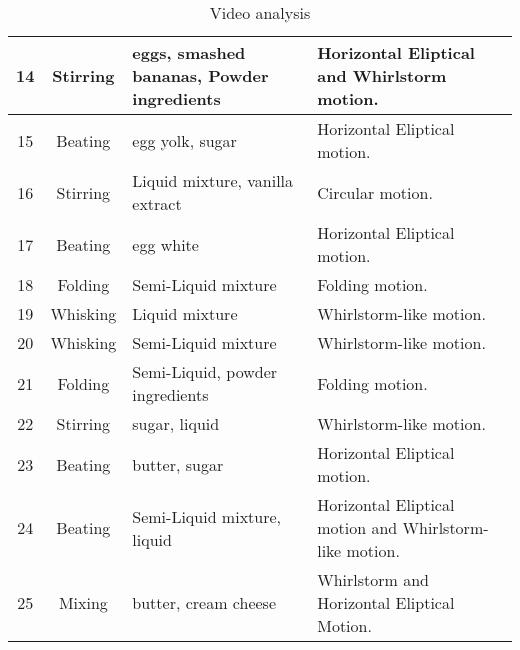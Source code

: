   \begin{table}[H]
    \centering
    \begin{tabular}{|c|c|p{}|p{}|}
        \hline
        14 & Stirring & eggs, smashed bananas, Powder ingredients & Horizontal Eliptical and Whirlstorm motion. \\
        \hline
        15 & Beating & egg yolk, sugar & Horizontal Eliptical motion. \\
        \hline
        16 & Stirring & Liquid mixture, vanilla extract & Circular motion. \\
        \hline
        17 & Beating & egg white & Horizontal Eliptical motion. \\
        \hline
        18 & Folding & Semi-Liquid mixture & Folding motion. \\
        \hline
        19 & Whisking & Liquid mixture & Whirlstorm-like motion. \\
        \hline
        20 & Whisking & Semi-Liquid mixture & Whirlstorm-like motion. \\
        \hline
        21 & Folding & Semi-Liquid, powder ingredients & Folding motion. \\
        \hline
        22 & Stirring & sugar, liquid & Whirlstorm-like motion. \\
        \hline
        23 & Beating & butter, sugar & Horizontal Eliptical motion. \\
        \hline
        24 & Beating & Semi-Liquid mixture, liquid & Horizontal Eliptical motion and Whirlstorm-like motion. \\
        \hline
        25 & Mixing & butter, cream cheese & Whirlstorm and Horizontal Eliptical Motion. \\
        \hline
      \end{tabular}
    \caption{Video analysis}
    \label{tab:videoanalysis}
  \end{table}

